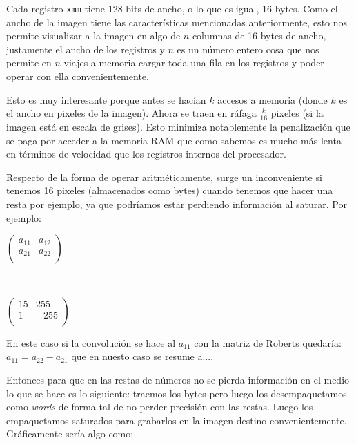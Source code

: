 Cada registro \texttt{xmm} tiene 128 bits de ancho, o lo que es igual, 16 bytes. Como el ancho de la imagen tiene las características mencionadas anteriormente, esto nos permite visualizar a la imagen en algo de $n$ columnas de 16 bytes de ancho, justamente el ancho de los registros y $n$ es un número entero cosa que nos permite en $n$ viajes a memoria cargar toda una fila en los registros y poder operar con ella convenientemente.

Esto es muy interesante porque antes se hacían $k$ accesos a memoria (donde $k$ es el ancho en pixeles de la imagen). Ahora se traen en ráfaga $\frac{k}{16}$ pixeles (si la imagen está en escala de grises). Esto minimiza notablemente la penalización que se paga por acceder a la memoria RAM que como sabemos es mucho más lenta en términos de velocidad que los registros internos del procesador.

Respecto de la forma de operar aritméticamente, surge un inconveniente si tenemos 16 pixeles (almacenados como bytes) cuando tenemos que hacer una resta por ejemplo, ya que podríamos estar perdiendo información al saturar. Por ejemplo:

\begin{center}
\begin{minipage}{0.30 \textwidth}
$\begin{pmatrix}
a_{11} & a_{12} \\
a_{21} & a_{22}  \\
\end{pmatrix}$
\end{minipage}
\ \ 
 \begin{minipage}{0.30 \textwidth}
$\begin{pmatrix}
15 & 255 \\
1 & -255 \\
\end{pmatrix}$
\end{minipage}
\end{center}

En este caso si la convolución se hace al $a_{11}$ con la matriz de Roberts quedaría: $a_{11} = a_{22} - a_{21}$ que en nuesto caso se resume a....

Entonces para que en las restas de números no se pierda información en el medio lo que se hace es lo siguiente: traemos los bytes pero luego los desempaquetamos como \emph{words} de forma tal de no perder precisión con las restas. Luego los empaquetamos saturados para grabarlos en la imagen destino convenientemente. Gráficamente sería algo como: 

